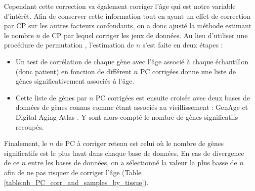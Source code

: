 Cependant cette correction va également corriger l'âge qui est notre variable d'intérêt. Afin de conserver cette information tout en ayant un effet de correction par CP sur les autres facteurs confondants, on a donc ajusté la méthode estimant le nombre $n$ de CP par lequel corriger les jeux de données. Au lieu d'utiliser une procédure de permutation , l'estimation de $n$ s'est faite en deux étapes :
\begin{itemize}
    \item Un test de corrélation de chaque gène avec l'âge associé à chaque échantillon (donc patient) en fonction de différent $n$ PC corrigées donne une liste de gènes significativement associés à l'âge.
    \item Cette liste de gènes par $n$ PC corrigées est ensuite croisée avec deux bases de données de gènes connus comme étant associés au vieillissement : GenAge  et Digital Aging Atlas . Y sont alors compté le nombre de gènes significatifs recoupés.
\end{itemize}
Finalement, le $n$ de PC à corriger retenu est celui où le nombre de gènes significatifs est le plus haut dans chaque base de données. En cas de divergence de ce $n$ entre les bases de données, on a sélectionné la valeur la plus basse de $n$ afin de ne pas risquer de corriger l'âge (Table \ref{table:nb_PC_corr_and_samples_by_tissue}).



